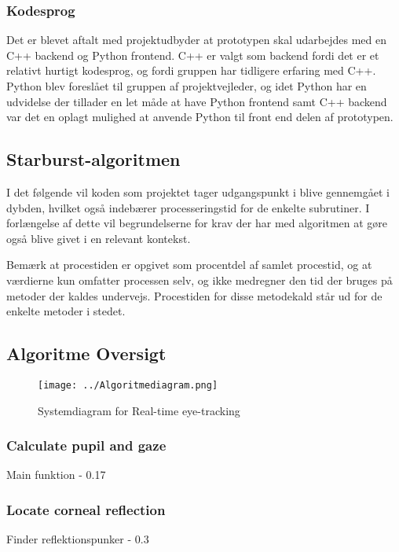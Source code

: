 \documentclass[rapport.tex]{subfiles}
\begin{document}
	
	
	\subsubsection{Kodesprog}
	Det er blevet aftalt med projektudbyder at prototypen skal udarbejdes med en C++ backend og Python frontend.
	C++ er valgt som backend fordi det er et relativt hurtigt kodesprog, og fordi gruppen har tidligere erfaring
	med C++. Python blev foreslået til gruppen af projektvejleder, og idet Python har en udvidelse der tillader
	en let måde at have Python frontend samt C++ backend var det en oplagt mulighed at anvende Python til front
	end delen af prototypen.
	\subsection{Starburst-algoritmen}
	I det følgende vil koden som projektet tager udgangspunkt i blive gennemgået i dybden, hvilket også indebærer processeringstid for de enkelte subrutiner. I forlængelse af dette vil begrundelserne for krav der har med algoritmen at gøre også blive givet i en relevant kontekst.
	
	Bemærk at procestiden er opgivet som procentdel af samlet procestid, og at værdierne kun omfatter processen selv, og ikke medregner den tid der bruges på metoder der kaldes undervejs. Procestiden for disse metodekald står ud for de enkelte metoder i stedet.
	
	\subsection{Algoritme Oversigt}
	\begin{figure}[h]
		\centering
		\texttt{[image: ../Algoritmediagram.png]}
		\caption[Systemdiagram]{Systemdiagram for Real-time eye-tracking}
		\label{fig:Systemdiagram}
	\end{figure}
	
	\subsubsection{Calculate pupil and gaze}
	
	Main funktion - 0.17%
	
	\subsubsection{Locate corneal reflection}
	
	Finder reflektionspunker - 0.3%
	
\end{document}
